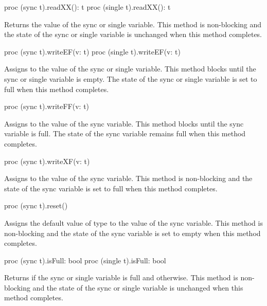 \begin{protohead}
proc (sync t).readXX(): t
proc (single t).readXX(): t
\end{protohead}
\begin{protobody}
Returns the value of the sync or single variable.  This method is non-blocking
and the state of the sync or single variable is unchanged when this method
completes.
\end{protobody}

\begin{protohead}
proc (sync t).writeEF(v: t)
proc (single t).writeEF(v: t)
\end{protohead}
\begin{protobody}
Assigns  to the value of the sync or single variable.  This
method blocks until the sync or single variable is empty.  The state
of the sync or single variable is set to full when this method
completes.
\end{protobody}

\begin{protohead}
proc (sync t).writeFF(v: t)
\end{protohead}
\begin{protobody}
Assigns  to the value of the sync variable.  This method
blocks until the sync variable is full.  The state of the sync
variable remains full when this method completes.
\end{protobody}

\begin{protohead}
proc (sync t).writeXF(v: t)
\end{protohead}
\begin{protobody}
Assigns  to the value of the sync variable.  This method is
non-blocking and the state of the sync variable is set to full when
this method completes.
\end{protobody}

\begin{protohead}
proc (sync t).reset()
\end{protohead}
\begin{protobody}
Assigns the default value of type  to the value of the sync
variable.  This method is non-blocking and the state of the sync
variable is set to empty when this method completes.
\end{protobody}

\begin{protohead}
proc (sync t).isFull: bool
proc (single t).isFull: bool
\end{protohead}
\begin{protobody}
Returns  if the sync or single variable is full and 
otherwise.  This method is non-blocking and the state of the sync or single
variable is unchanged when this method completes.
\end{protobody}

